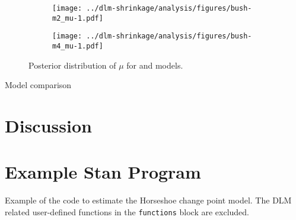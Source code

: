 \begin{figure}[thbp!]
  \begin{subfigure}[b]{\linewidth}
    \texttt{[image: ../dlm-shrinkage/analysis/figures/bush-m2\_mu-1.pdf]}
    \caption{}
  \end{subfigure}

  \begin{subfigure}[b]{\linewidth}
    \texttt{[image: ../dlm-shrinkage/analysis/figures/bush-m4\_mu-1.pdf]}
    \caption{}
  \end{subfigure}
  \caption{Posterior distribution of $\mu$ for  and  models.}
  \label{dlm:fig:bush_mu2}
\end{figure}


Model comparison

\begin{table}[thbp!]
  \centering
  
  \caption{}
  \label{dlm:tab:bush_model_comp}
\end{table}



\section{Discussion}
\label{dlm:sec:discussion}




\section{Example Stan Program}
\label{dlm:sec:example-stan-program}

Example of the code to estimate the Horseshoe change point model.
The DLM related user-defined functions in the \texttt{functions} block are excluded.


\inputminted[firstline=5,style=bw]{stan}{../dlm-shrinkage/stan/changepoint_horseshoe.stan.mustache}  


